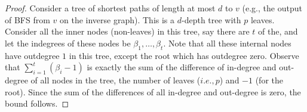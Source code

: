 {\begin{proof}


Consider a tree of shortest paths of length at most $d$ to $v$ (e.g., the output of BFS from $v$ on the inverse graph). This is a $d$-depth tree with $p$ leaves. Consider all the inner nodes (non-leaves) in this tree, say there are $t$ of the, and let the indegrees of these nodes be $\beta_1,\ldots,\beta_t$. Note that all these internal nodes have outdegree $1$ in this tree, except the root which has outdegree zero.
Observe that $\sum_{i=1}^t(\beta_i-1)$ is exactly the sum of the difference of in-degree and out-degree of all nodes in the tree, the number of leaves ($i.e.,p$) and $-1$ (for the root). Since the sum of the differences of all in-degree and out-degree is zero, the bound follows.


\end{proof}}
